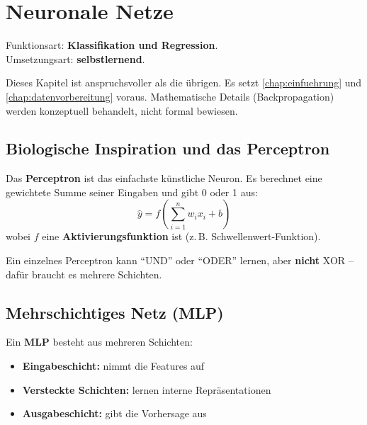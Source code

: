 \chapter{Neuronale Netze}
\label{chap:neuronale-netze}

\begin{myremark}
Funktionsart: \textbf{Klassifikation und Regression}. \\
Umsetzungsart: \textbf{selbstlernend}.
\end{myremark}

\begin{myremark}
Dieses Kapitel ist anspruchsvoller als die übrigen.
Es setzt \cref{chap:einfuehrung} und \cref{chap:datenvorbereitung} voraus. Mathematische Details (Backpropagation) werden
konzeptuell behandelt, nicht formal bewiesen.
\end{myremark}

\section{Biologische Inspiration und das Perceptron}

\begin{mydefinition}[Perceptron]
Das \textbf{Perceptron} ist das einfachste künstliche Neuron.
Es berechnet eine gewichtete Summe seiner Eingaben und gibt 0 oder 1 aus:
\[
\hat{y} = f\!\left(\sum_{i=1}^{n} w_i x_i + b\right)
\]
wobei $f$ eine \textbf{Aktivierungsfunktion} ist (z.\,B. Schwellenwert-Funktion).
\end{mydefinition}

\begin{myexample}
Ein einzelnes Perceptron kann \enquote{UND} oder \enquote{ODER} lernen,
aber \textbf{nicht} XOR -- dafür braucht es mehrere Schichten.
\end{myexample}

\section{Mehrschichtiges Netz (MLP)}

\begin{mydefinition}
Ein \textbf{MLP} besteht aus mehreren Schichten:
\begin{itemize}
    \item \textbf{Eingabeschicht:} nimmt die Features auf
    \item \textbf{Versteckte Schichten:} lernen interne Repräsentationen
    \item \textbf{Ausgabeschicht:} gibt die Vorhersage aus
\end{itemize}
\end{mydefinition}

